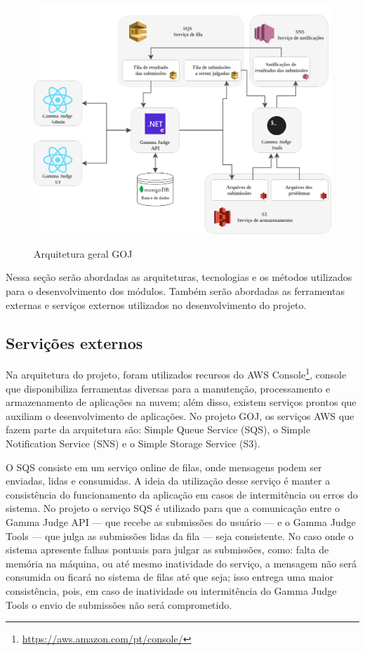 \begin{figure}[H]
    \centering
    \caption{Arquitetura geral GOJ}
    \includegraphics[keepaspectratio=true,scale=0.45]{figuras/arquitetura_goj.png}
    \label{fig:arquitetura_goj}
\end{figure}

Nessa seção serão abordadas as arquiteturas, tecnologias e os métodos utilizados para o desenvolvimento dos módulos. Também serão abordadas as ferramentas externas e serviços externos utilizados no desenvolvimento do projeto.

\subsection{Servições externos} 
\label{subsec:arquitetura_servicos_ext}

Na arquitetura do projeto, foram utilizados recursos do AWS Console\footnote{\url{https://aws.amazon.com/pt/console/}}, console que disponibiliza ferramentas diversas para a manutenção, processamento e armazenamento de aplicações na nuvem; além disso, existem serviços prontos que auxiliam o desenvolvimento de aplicações. No projeto GOJ, os serviços AWS que fazem parte da arquitetura são: Simple Queue Service (SQS), o Simple Notification Service (SNS) e o Simple Storage Service (S3).

O SQS consiste em um serviço online de filas, onde mensagens podem ser enviadas, lidas e consumidas. A ideia da utilização desse serviço é manter a consistência do funcionamento da aplicação em casos de intermitência ou erros do sistema. No projeto o serviço SQS é utilizado para que a comunicação entre o Gamma Judge API — que recebe as submissões do usuário — e o Gamma Judge Tools — que julga as submissões lidas da fila — seja consistente. No caso onde o sistema apresente falhas pontuais para julgar as submissões, como: falta de memória na máquina, ou até mesmo inatividade do serviço, a mensagem não será consumida ou ficará no sistema de filas até que seja; isso entrega uma maior consistência, pois, em caso de inatividade ou intermitência do Gamma Judge Tools o envio de submissões não será comprometido.

